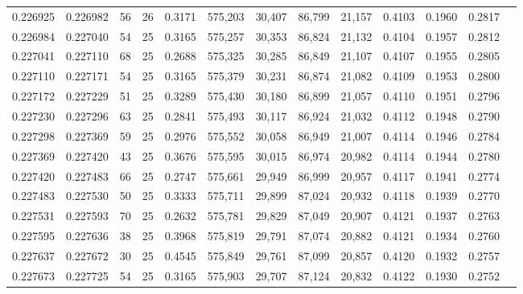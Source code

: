 \begin{tabular}{rrrrrrrrrrrrr}
0.226925 & 0.226982 &    56 &  26 &                                     0.3171 & 575,203 &  30,407 &  86,799 &  21,157 & 0.4103 & 0.1960 & 0.2817 \\
0.226984 & 0.227040 &    54 &  25 &                                     0.3165 & 575,257 &  30,353 &  86,824 &  21,132 & 0.4104 & 0.1957 & 0.2812 \\
0.227041 & 0.227110 &    68 &  25 &                                     0.2688 & 575,325 &  30,285 &  86,849 &  21,107 & 0.4107 & 0.1955 & 0.2805 \\
0.227110 & 0.227171 &    54 &  25 &                                     0.3165 & 575,379 &  30,231 &  86,874 &  21,082 & 0.4109 & 0.1953 & 0.2800 \\
0.227172 & 0.227229 &    51 &  25 &                                     0.3289 & 575,430 &  30,180 &  86,899 &  21,057 & 0.4110 & 0.1951 & 0.2796 \\
0.227230 & 0.227296 &    63 &  25 &                                     0.2841 & 575,493 &  30,117 &  86,924 &  21,032 & 0.4112 & 0.1948 & 0.2790 \\
0.227298 & 0.227369 &    59 &  25 &                                     0.2976 & 575,552 &  30,058 &  86,949 &  21,007 & 0.4114 & 0.1946 & 0.2784 \\
0.227369 & 0.227420 &    43 &  25 &                                     0.3676 & 575,595 &  30,015 &  86,974 &  20,982 & 0.4114 & 0.1944 & 0.2780 \\
0.227420 & 0.227483 &    66 &  25 &                                     0.2747 & 575,661 &  29,949 &  86,999 &  20,957 & 0.4117 & 0.1941 & 0.2774 \\
0.227483 & 0.227530 &    50 &  25 &                                     0.3333 & 575,711 &  29,899 &  87,024 &  20,932 & 0.4118 & 0.1939 & 0.2770 \\
0.227531 & 0.227593 &    70 &  25 &                                     0.2632 & 575,781 &  29,829 &  87,049 &  20,907 & 0.4121 & 0.1937 & 0.2763 \\
0.227595 & 0.227636 &    38 &  25 &                                     0.3968 & 575,819 &  29,791 &  87,074 &  20,882 & 0.4121 & 0.1934 & 0.2760 \\
0.227637 & 0.227672 &    30 &  25 &                                     0.4545 & 575,849 &  29,761 &  87,099 &  20,857 & 0.4120 & 0.1932 & 0.2757 \\
0.227673 & 0.227725 &    54 &  25 &                                     0.3165 & 575,903 &  29,707 &  87,124 &  20,832 & 0.4122 & 0.1930 & 0.2752 \\

\end{tabular}
